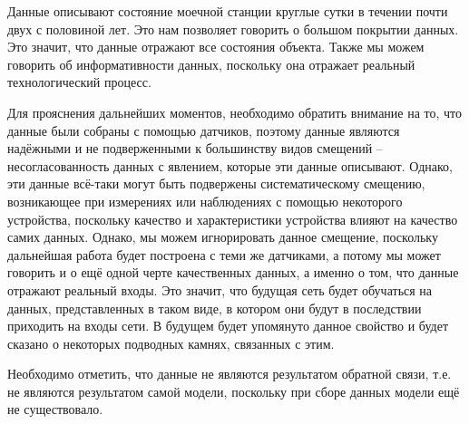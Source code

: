 {  \par \redline Данные описывают состояние моечной станции круглые сутки в течении почти двух с половиной лет. Это нам позволяет говорить о большом покрытии данных. Это значит, что данные отражают все состояния объекта. Также мы можем говорить об информативности данных, поскольку она отражает реальный технологический процесс.
  
  \par \redline Для прояснения дальнейших моментов, необходимо обратить внимание на то, что данные были собраны с помощью датчиков, поэтому данные являются надёжными и не подверженными к большинству видов смещений {--} несогласованность данных с явлением, которые эти данные описывают.  Однако, эти данные всё-таки могут быть подвержены систематическому смещению, возникающее при измерениях или наблюдениях с помощью некоторого устройства, поскольку качество и характеристики устройства влияют на качество самих данных. Однако, мы можем игнорировать данное смещение, поскольку дальнейшая работа будет построена с теми же датчиками, а потому мы может говорить и о ещё одной черте качественных данных, а именно о том, что данные отражают реальный входы. Это значит, что будущая сеть будет обучаться на данных, представленных в таком виде, в котором они будут в последствии приходить на входы сети. В будущем будет упомянуто данное свойство и будет сказано о некоторых подводных камнях, связанных с этим.
  
  \par \redline Необходимо отметить, что данные не являются результатом обратной связи, т.е. не являются результатом самой модели, поскольку при сборе данных модели ещё не существовало.
  
  \par \redline
  
}

